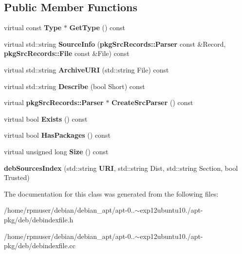 \subsection*{\-Public \-Member \-Functions}
\begin{DoxyCompactItemize}
\item 
virtual const {\bf \-Type} $\ast$ {\bfseries \-Get\-Type} () const \label{classdebSourcesIndex_a97e9791ce2bb129d7b03dfe2f55de366}

\item 
virtual std\-::string {\bfseries \-Source\-Info} ({\bf pkg\-Src\-Records\-::\-Parser} const \&\-Record, {\bf pkg\-Src\-Records\-::\-File} const \&\-File) const \label{classdebSourcesIndex_aa664249fc20599616314f091fc9a1cd0}

\item 
virtual std\-::string {\bfseries \-Archive\-U\-R\-I} (std\-::string \-File) const \label{classdebSourcesIndex_ac797e5aad2fdbc2462e14647d924185e}

\item 
virtual std\-::string {\bfseries \-Describe} (bool \-Short) const \label{classdebSourcesIndex_a1d76db0d4174d2926a4c5af85e1019d9}

\item 
virtual {\bf pkg\-Src\-Records\-::\-Parser} $\ast$ {\bfseries \-Create\-Src\-Parser} () const \label{classdebSourcesIndex_a890bdfc36ac222b8f39447648fdbe142}

\item 
virtual bool {\bfseries \-Exists} () const \label{classdebSourcesIndex_aa746a17c5bebccb81d72dccb29948ec4}

\item 
virtual bool {\bfseries \-Has\-Packages} () const \label{classdebSourcesIndex_a3529b24d8d4f049bd120b93d56d467d0}

\item 
virtual unsigned long {\bfseries \-Size} () const \label{classdebSourcesIndex_ab1050fe2604ef4e6cba6491de8a9f708}

\item 
{\bfseries deb\-Sources\-Index} (std\-::string {\bf \-U\-R\-I}, std\-::string \-Dist, std\-::string \-Section, bool \-Trusted)\label{classdebSourcesIndex_ad99a3054a5a91e53a0837320b524da67}

\end{DoxyCompactItemize}


\-The documentation for this class was generated from the following files\-:\begin{DoxyCompactItemize}
\item 
/home/rpmuser/debian/debian\-\_\-apt/apt-\/0..$\sim$exp12ubuntu10./apt-\/pkg/deb/debindexfile.\-h\item 
/home/rpmuser/debian/debian\-\_\-apt/apt-\/0..$\sim$exp12ubuntu10./apt-\/pkg/deb/debindexfile.\-cc\end{DoxyCompactItemize}
